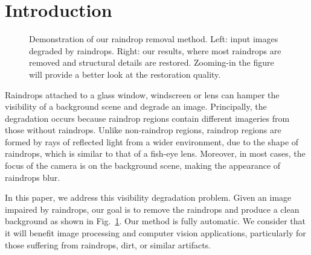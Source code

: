 \documentclass[10pt,twocolumn,letterpaper]{article}
\def\WIDTHTWO{0.45\linewidth}
\begin{document}

\section{Introduction}

\begin{figure}
	\centering
	\vfill\vspace{-2.5mm}
	\vfill\vspace{-2.5mm}
	\caption{Demonstration of our raindrop removal method. Left: input images degraded by raindrops. Right: our results, where most raindrops are removed and structural details are restored. Zooming-in the figure will provide a better look at the restoration quality.}
	\label{fig:trailer}
\end{figure}

Raindrops attached to a glass window, windscreen or lens can hamper the visibility of a background scene and degrade an image. Principally, the degradation occurs because raindrop regions contain different  imageries from those without raindrops.  Unlike non-raindrop regions,  raindrop regions are formed by rays of reflected light from a wider environment, due to the shape of raindrops, which is similar to that of a fish-eye lens. Moreover, in most cases, the focus of the camera is on the background scene, making the appearance of raindrops blur.

In this paper, we address this visibility degradation problem. Given an image impaired by raindrops, our goal is to remove the raindrops and produce a clean background as shown in Fig.~\ref{fig:trailer}. Our method is fully automatic. We consider that it will benefit image processing and computer vision applications, particularly for those suffering from raindrops, dirt, or similar artifacts.
\end{document}
